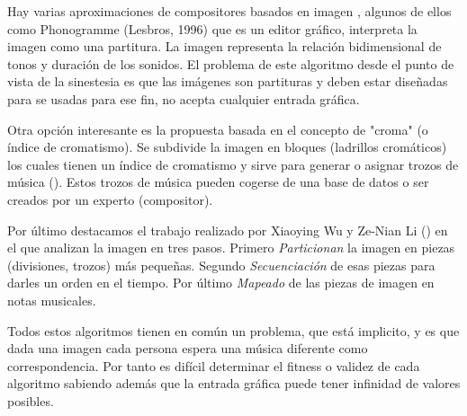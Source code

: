 Hay varias aproximaciones de compositores basados en imagen , algunos de ellos como Phonogramme (\cite{Phonogramme}Lesbros, 1996) que es un editor gráfico, interpreta la imagen como una partitura. La imagen representa la relación bidimensional de tonos y duración de los sonidos. El problema de este algoritmo desde el punto de vista de la sinestesia es que las imágenes son partituras y deben estar diseñadas para se usadas para ese fin, no acepta cualquier entrada gráfica. 

Otra opción interesante es la propuesta basada en el concepto de "croma" (o índice de cromatismo). Se subdivide la imagen en bloques (ladrillos cromáticos) los cuales tienen un índice de cromatismo y sirve para generar o asignar trozos de música (\cite{bricksConvertMusic}). Estos trozos de música pueden cogerse de una base de datos o ser creados por un experto (compositor).

Por último destacamos el trabajo realizado por Xiaoying Wu y Ze-Nian Li (\cite{ImageBaseComposition}) en el que analizan la imagen en tres pasos. Primero \emph{Particionan} la imagen en piezas (divisiones, trozos) más pequeñas. Segundo \emph{Secuenciación} de esas piezas para darles un orden en el tiempo. Por último \emph{Mapeado} de las piezas de imagen en notas musicales.

Todos estos algoritmos tienen en común un problema, que está implicito, y es que dada una imagen cada persona espera una música diferente como correspondencia. Por tanto es difícil determinar el fitness o validez de cada algoritmo sabiendo además que la entrada gráfica puede tener infinidad de valores posibles.

